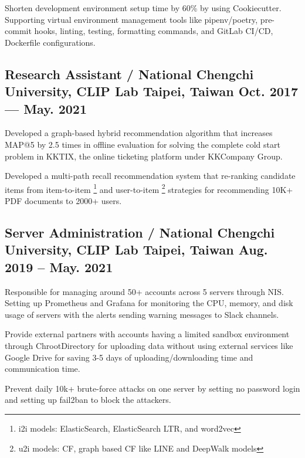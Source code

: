 \begin{zitemize}
\item Shorten development environment setup time by 60\% by using Cookiecutter. Supporting virtual environment management tools like pipenv/poetry, pre-commit hooks, linting, testing, formatting commands, and GitLab CI/CD, Dockerfile configurations.
\end{zitemize}

\subsection{{Research Assistant / National Chengchi University, CLIP Lab \hfill Taipei, Taiwan \> Oct. 2017 --- May. 2021}}

\begin{zitemize}
\item Developed a graph-based hybrid recommendation algorithm that increases MAP@5 by 2.5 times in offline evaluation for solving the complete cold start problem in KKTIX, the online ticketing platform under KKCompany Group.
\end{zitemize}

\begin{zitemize}
\item Developed a multi-path recall recommendation system that re-ranking candidate items from item-to-item \footnote{i2i models: ElasticSearch, ElasticSearch LTR, and word2vec} and user-to-item \footnote{u2i models: CF, graph based CF like LINE and DeepWalk models} strategies for recommending 10K+ PDF documents to 2000+ users.
\end{zitemize}

\subsection{{Server Administration / National Chengchi University, CLIP Lab \hfill Taipei, Taiwan \> Aug. 2019 -- May. 2021}}
\begin{zitemize}
  \item Responsible for managing around 50+ accounts across 5 servers through NIS. Setting up Prometheus and Grafana for monitoring the CPU, memory, and disk usage of servers with the alerts sending warning messages to Slack channels.
  \item Provide external partners with accounts having a limited sandbox environment through ChrootDirectory for uploading data without using external services like Google Drive for saving 3-5 days of uploading/downloading time and communication time.
  \item Prevent daily 10k+ brute-force attacks on one server by setting no password login and setting up fail2ban to block the attackers.
\end{zitemize}

